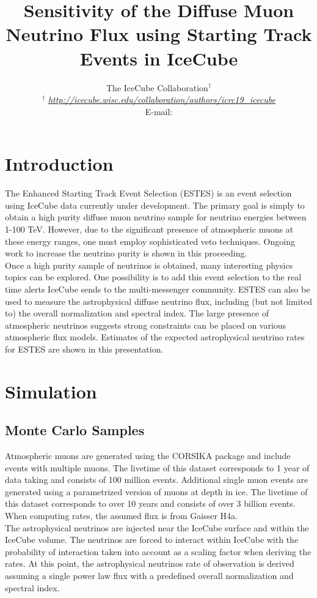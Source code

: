 \documentclass{PoS}
\title{Sensitivity of the Diffuse Muon Neutrino Flux using Starting Track Events in IceCube}
\author{
The IceCube Collaboration$^{\dagger}$\\
{$^{\dagger}$ \itshape \href{http://icecube.wisc.edu/collaboration/authors/icrc19_icecube}{http://icecube.wisc.edu/collaboration/authors/icrc19\_icecube}}\\
E-mail: \email{msilva@icecube.wisc.edu, smancina@icecube.wisc.edu}
}
\begin{document}

\section{Introduction}\label{sec:info}
The Enhanced Starting Track Event Selection (ESTES) is an event selection using IceCube data currently under development. The primary goal is simply to obtain a high purity diffuse muon neutrino sample for neutrino energies between 1-100 TeV. However, due to the significant presence of atmospheric muons at these energy ranges, one must employ sophisticated veto techniques. Ongoing work to increase the neutrino purity is shown in this proceeding. \\
Once a high purity sample of neutrinos is obtained, many interesting physics topics can be explored. One possibility is to add this event selection to the real time alerts IceCube sends to the multi-messenger community\cite{ESTESv1:2019icrc_ESTESv1}. ESTES can also be used to measure the astrophysical diffuse neutrino flux, including (but not limited to) the overall normalization and spectral index. The large presence of atmospheric neutrinos suggests strong constraints can be placed on various atmospheric flux models. Estimates of the expected astrophysical neutrino rates for ESTES are shown in
this presentation. 


\section{Simulation}\label{sec:sim}

\subsection{Monte Carlo Samples}\label{sec:MC}
Atmospheric muons are generated using the CORSIKA package and include events with multiple muons. The livetime of this dataset corresponds to 1 year of data taking and consists of 100 million events. Additional single muon events are generated using a parametrized version of muons at depth in ice. The livetime of this dataset corresponds to over 10 years and consists of over 3 billion events. When computing rates, the assumed flux is from Gaisser H4a\cite{H4a}.\\
The astrophysical neutrinos are injected near the IceCube surface and within the IceCube volume. The neutrinos are forced to interact within IceCube with the probability of interaction taken into account as a scaling factor when deriving the rates. At this point, the astrophysical neutrinos rate of observation is derived assuming a single power law flux with a predefined overall normalization and spectral index.
\end{document}
